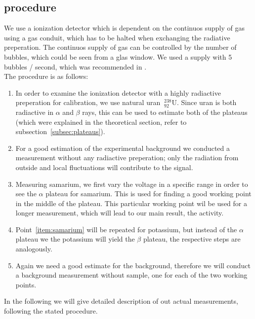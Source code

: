 \subsection{procedure}
We use a ionization detector which is dependent on the continuos supply of 
gas using a gas conduit, which has to be halted when exchanging the radiative
preperation. The continuos supply of gas can be controlled by the number of
bubbles, which could be seen from a glas window. 
We used a supply with 5 bubbles / second, which was recommended in \cite{ver}.\\
The procedure is as follows:  
\begin{enumerate}
\item In order to examine the ionization detector with a highly radiactive 
preperation for calibration, we use natural uran $\mathrm{~^{238}_{92}U}$.
Since uran is both radiactive in $\alpha$ and $\beta$ rays, this can be used
to estimate both of the plateaus (which were explained in the theoretical section,
refer to subsection~\ref{subsec:plateaus}).
\item For a good estimation of the experimental background we conducted a measurement
without any radiactive preperation; only the radiation from outside and local fluctuations
will contribute to the signal.
\item Measuring samarium, we first vary the voltage in a specific range in order to 
see the $\alpha$ plateau for samarium. This is used for finding a good working point in the middle
of the plateau. This particular working point wil be used for a longer measurement, which will lead to our main result,
the activity. \label{item:samarium}
\item Point~\ref{item:samarium} will be repeated for potassium, but instead of the $\alpha$ plateau
we the potassium will yield the $\beta$ plateau, the respective steps are analogously. 
\item Again we need a good estimate for the background, therefore we will conduct a background measurement
without sample, one for each of the two working points.
\end{enumerate}
In the following we will give detailed description of out actual measurements, following the 
stated procedure. 
